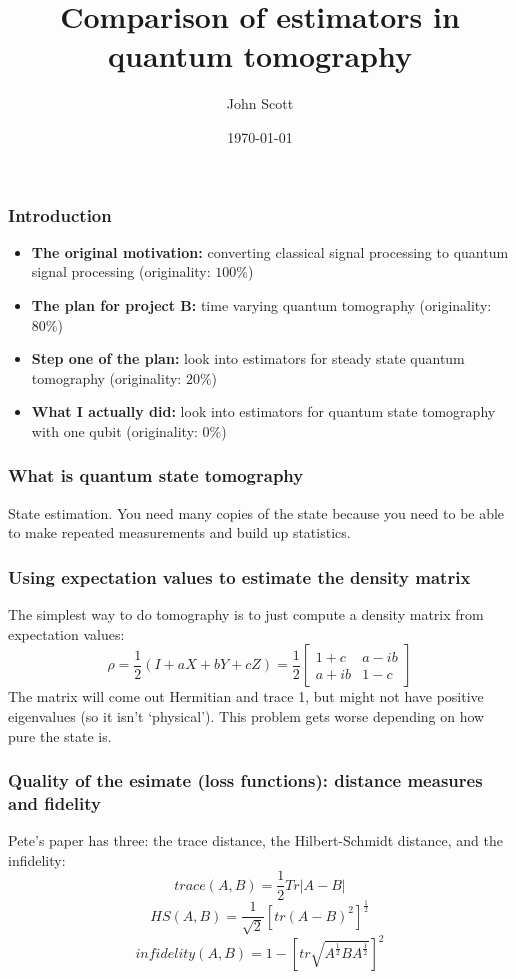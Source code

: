 \documentclass{beamer}
\title{Comparison of estimators in quantum tomography}
\author{John Scott}
\date{\today}
\begin{document}
\begin{frame}
  \titlepage
\end{frame}

\begin{frame}
  \frametitle{Introduction}
  \begin{itemize}
  \item \textbf{The original motivation:} converting classical signal processing to quantum signal processing (originality: $100\%$)
  \item \textbf{The plan for project B:} time varying quantum tomography (originality: $80\%$)
  \item \textbf{Step one of the plan:} look into estimators for steady state quantum tomography (originality: $20\%$)
  \item \textbf{What I actually did:} look into estimators for quantum state tomography with one qubit (originality: $0\%$)
  \end{itemize}
\end{frame}

\begin{frame}
  \frametitle{What is quantum state tomography}
  State estimation. You need many copies of the state because you need to be able to make repeated measurements and build up statistics.
\end{frame}

\begin{frame}
  \frametitle{Using expectation values to estimate the density matrix}
  The simplest way to do tomography is to just compute a density matrix from expectation values:
  \begin{equation}
    \rho = \frac{1}{2} (I + aX + bY + cZ) = \frac{1}{2}\begin{bmatrix} 1 + c & a - ib \\ a + ib & 1 -c\end{bmatrix}    
  \end{equation}
  The matrix will come out Hermitian and trace 1, but might not have positive eigenvalues (so it isn't `physical'). This problem gets worse depending on how pure the state is. 
\end{frame}

\begin{frame}
  \frametitle{Quality of the esimate (loss functions): distance measures and fidelity}
  Pete's paper has three: the trace distance, the Hilbert-Schmidt distance, and the infidelity:
  \begin{equation}trace(A,B) = \frac{1}{2} Tr|A - B|\end{equation}
  \begin{equation}HS(A,B) = \frac{1}{\sqrt{2}} \left[tr(A - B)^2\right]^{\frac{1}{2}}\end{equation}
  \begin{equation}infidelity(A,B) = 1 - \left[tr\sqrt{A^{\frac{1}{2}}BA^{\frac{1}{2}}}\right]^2\end{equation}
\end{frame}
\end{document}
